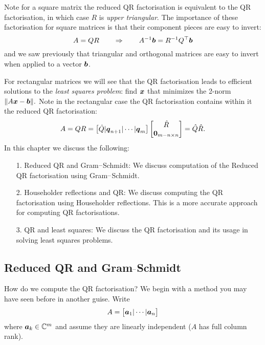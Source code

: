 Note for a square matrix the reduced QR factorisation is equivalent to the QR factorisation, in which case $R$ is \emph{upper triangular}. The importance of these factorisation for square matrices is that their component pieces are easy to invert:
\[
A = QR \qquad \Rightarrow \qquad A^{-1}\bm{{\mbox{\boldmath$b$\unboldmath}}} = R^{-1} Q^\top \bm{{\mbox{\boldmath$b$\unboldmath}}}
\]
and we saw previously that triangular and orthogonal matrices are easy to invert when applied to a vector $\bm{{\mbox{\boldmath$b$\unboldmath}}}$.

For rectangular matrices we will see that the QR factorisation leads to efficient solutions to the \emph{least squares problem}: find $\bm{{\mbox{\boldmath$x$\unboldmath}}}$ that minimizes the 2-norm $\| A \bm{{\mbox{\boldmath$x$\unboldmath}}} - \bm{{\mbox{\boldmath$b$\unboldmath}}} \|.$ Note in the rectangular case the QR factorisation contains within it the reduced QR factorisation:
\[
A = QR = \begin{bmatrix} \hat Q | \bm{{\mbox{\boldmath$q$\unboldmath}}}_{n+1} | \cdots | \bm{{\mbox{\boldmath$q$\unboldmath}}}_m \end{bmatrix} \begin{bmatrix} \hat R \\  \bm{{\mbox{\boldmath$0$\unboldmath}}}_{m-n \times n} \end{bmatrix} = \hat Q \hat R.
\]
In this chapter we discuss the following:

\begin{itemize}
\item[1. ] Reduced QR and Gram\ensuremath{\endash}Schmidt: We discuss computation of the Reduced QR factorisation using Gram\ensuremath{\endash}Schmidt.


\item[2. ] Householder reflections and QR: We discuss computing the  QR factorisation using Householder reflections. This is a more accurate approach for computing QR factorisations.


\item[3. ] QR and least squares: We discuss the QR factorisation and its usage in solving least squares problems.

\end{itemize}
\subsection{Reduced QR and Gram\ensuremath{\endash}Schmidt}
How do we compute the QR factorisation? We begin with a method you may have seen before in another guise. Write
\[
A = \begin{bmatrix} \bm{{\mbox{\boldmath$a$\unboldmath}}}_1 | \cdots | \bm{{\mbox{\boldmath$a$\unboldmath}}}_n \end{bmatrix}
\]
where $\bm{{\mbox{\boldmath$a$\unboldmath}}}_k \in  {\mathbb C}^m$ and assume they are linearly independent ($A$ has full column rank).

